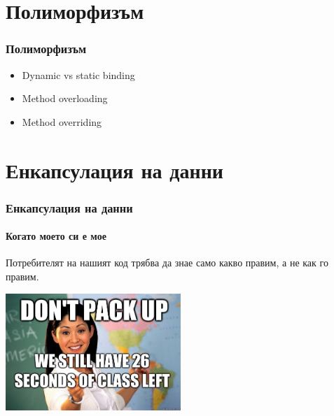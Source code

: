 \documentclass{beamer}
\begin{document}
  \section{Полиморфизъм}

  \begin{frame}
    \frametitle{Полиморфизъм}
    \begin{itemize}
      \item{Dynamic vs static binding}
      \item{Method overloading}
      \item{Method overriding}
    \end{itemize}
  \end{frame}

  \section{Енкапсулация на данни}

  \begin{frame}
    \frametitle{Енкапсулация на данни}
    \framesubtitle{Когато моето си е мое}
    Потребителят на нашият код трябва да знае само какво правим, а не как го правим.
  \end{frame}

  \begin{frame}
    \includegraphics[width=250px]{img/scumbag_teacher}
  \end{frame}
\end{document}
